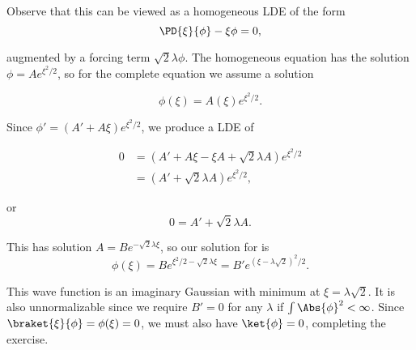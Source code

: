 {Observe that this can be viewed as a homogeneous LDE of the form
\begin{equation}\label{eqn:qmIexamPractice2008Dec:1e:40}
\PD{\xi}{\phi} - \xi \phi = 0,
\end{equation}

augmented by a forcing term \(\sqrt{2}\lambda \phi\).  The homogeneous equation has the solution \(\phi = A e^{\xi^2/2}\), so for the complete equation we assume a solution 

\begin{equation}\label{eqn:qmIexamPractice2008Dec:1e:50}
\phi(\xi) = A(\xi) e^{\xi^2/2}.
\end{equation}

Since \(\phi' = (A' + A \xi) e^{\xi^2/2}\), we produce a LDE of

\begin{equation}\label{eqn:qmIexamPractice:670}
\begin{aligned}
0 &= (A' + A \xi -\xi A + \sqrt{2} \lambda A ) e^{\xi^2/2} \\
&= (A' + \sqrt{2} \lambda A ) e^{\xi^2/2},
\end{aligned}
\end{equation}

or
\begin{equation}\label{eqn:qmIexamPractice2008Dec:1e:60}
0 = A' + \sqrt{2} \lambda A.
\end{equation}

This has solution \(A = B e^{-\sqrt{2} \lambda \xi}\), so our solution for  is
\begin{equation}\label{eqn:qmIexamPractice2008Dec:1e:70}
\phi(\xi) = B e^{\xi^2/2 - \sqrt{2} \lambda \xi} 
= B' e^{ (\xi - \lambda \sqrt{2} )^2/2}.
\end{equation}

This wave function is an imaginary Gaussian with minimum at \(\xi = \lambda\sqrt{2}\).  It is also unnormalizable since we require \(B' = 0\) for any \(\lambda\) if \(\int \Abs{\phi}^2 < \infty\).  Since \(\braket{\xi}{\phi} = \phi(\xi) = 0\), we must also have \(\ket{\phi} = 0\), completing the exercise.

} %
